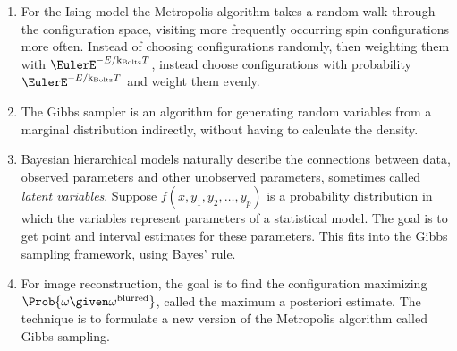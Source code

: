 \documentclass[12pt]{article}
\newcommand{\kT}{{\text k}_{\text{Boltz}}T}
\begin{document}
\begin{enumerate}
    \item
        For the Ising model the Metropolis algorithm takes a random walk
        through the configuration space, visiting more frequently
        occurring spin configurations more often.  Instead of choosing
        configurations randomly, then weighting them with \( \EulerE^{-E/\kT}
        \), instead choose configurations with probability \( \EulerE^{-E/\kT}
        \) and weight them evenly.
    \item
        The Gibbs sampler is an algorithm for generating random
        variables from a marginal distribution indirectly, without
        having to calculate the density.
    \item
        Bayesian hierarchical models naturally describe the connections
        between data, observed parameters and other unobserved
        parameters, sometimes called \emph{latent variables}.  Suppose \(
        f(x, y_1, y_2, \dots, y_p) \) is a probability distribution in
        which the variables represent parameters of a statistical model.
        The goal is to get point and interval estimates for these
        parameters.  This fits into the Gibbs sampling framework, using
        Bayes' rule.
    \item
        For image reconstruction, the goal is to find the configuration
        maximizing \( \Prob{\omega \given \omega^{\text{blurred}}} \),
        called the maximum a posteriori estimate.  The technique is to
        formulate a new version of the Metropolis algorithm called Gibbs
        sampling.
\end{enumerate}

\hr

\end{document}
